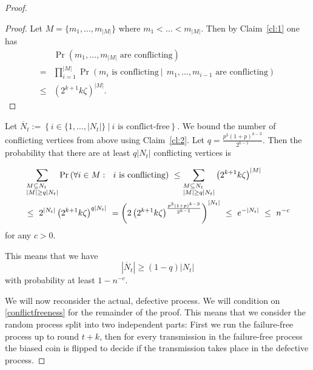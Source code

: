 \documentclass[12pt]{article}
\newcommand{\oN}{{\overline{N}}}
\newcommand{\menge}[2]{\left\{{#1}\ \left| \ {#2}\right.\right\}}
\newcommand{\clref}[1]{Claim~\ref{cl:#1}}
\begin{document}
{\begin{proof}
\begin{proof}
Let $M = \{m_1, \dots, m_{|M|}\}$ where $m_1 < \dots < m_{|M|}$. Then by \clref{1} one has
\begin{align*}
 &\Pr\left(m_1, \dots, m_{|M|}\mbox{ are conflicting}\right)\\
= &\prod_{i =1}^{|M|}\Pr\left(m_i\mbox{ is conflicting}\ |\ \  m_1, \dots, m_{i-1}\mbox{ are conflicting}\right)\\
\leq &\left(2^{k+1}k\zeta\right)^{|M|}.
\end{align*}

\end{proof}

Let $\oN_t :=\menge{i \in \{1, \dots , |N_t|\}}{i \mbox { is conflict-free}}.$
We bound the number of conflicting vertices from above using \clref{2}.
Let $q=\frac{p^3(1+p)^{k-3}}{2^{k-1}}$. Then the probability that there are at least $q|N_t|$ conflicting vertices is

\begin{align*}
&\sum_{\begin{subarray}
            1M\subseteq N_t \\ |M|\geq q|N_t|
           \end{subarray}} \Pr\left(\forall i \in M: \ \ i\mbox{ is conflicting}\right)
\ \leq \sum_{\begin{subarray}
            1M\subseteq N_t \\ |M|\geq q|N_t|
           \end{subarray}} \left(2^{k+1}k\zeta\right)^{|M|}\\ 
& \leq\ 2^{|N_t|}\left(2^{k+1}k\zeta	\right)^{q|N_t|}\
= \left(2\left(2^{k+1}k\zeta	\right)^{\frac{p^3(1+p)^{k-3}}{2^{k-1}}}	\right)^{|N_t|}\
\leq\ e^{-|N_t|}\
\leq\ n^{-c}
\end{align*}
for any $c>0$.

This means that we have
\begin{equation}\label{conflictfreeness}
|\oN_t| \geq (1-q)|N_t|
\end{equation}
with probability at least $1 - n^{-c}$.

We will now reconsider the actual, defective process. We will condition on \eqref{conflictfreeness} for the remainder of the proof. This means that we consider the random process split into two independent parts: First we run the failure-free process up to round $t+k$, then for every transmission in the failure-free process the biased coin is flipped to decide if the transmission takes place in the defective process.


\end{proof}}
\end{document}
